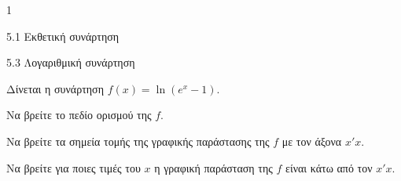 \begin{ylh}{1}
\item 5.1 Εκθετική συνάρτηση
\item 5.3 Λογαριθμική συνάρτηση
\end{ylh}
Δίνεται η συνάρτηση $f(x) = \ln(e^x - 1)$.
\begin{alist}
\item Να βρείτε το πεδίο ορισμού της $f$.
\item Να βρείτε τα σημεία τομής της γραφικής παράστασης της $f$ με τον άξονα $x'x$.
\item Να βρείτε για ποιες τιμές του $x$ η γραφική παράσταση της $f$ είναι κάτω από τον $x'x$.
\end{alist}

